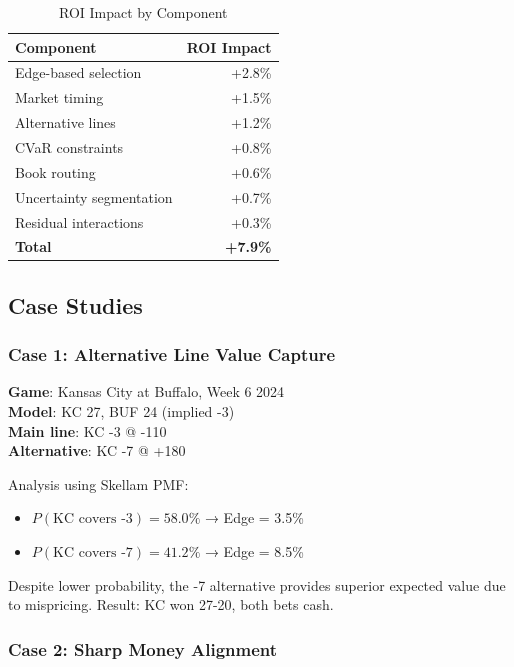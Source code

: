 

\begin{table}[!ht]
\centering
\caption{ROI Impact by Component}
\label{tab:profit-optimization-ablation}
\begin{tabular}{lr}
\toprule
 \textbf{Component} & \textbf{ROI Impact} \\
\midrule
Edge-based selection & +2.8\% \\
Market timing & +1.5\% \\
Alternative lines & +1.2\% \\
CVaR constraints & +0.8\% \\
Book routing & +0.6\% \\
Uncertainty segmentation & +0.7\% \\
Residual interactions & +0.3\% \\
\midrule
\textbf{Total} & \textbf{+7.9\%} \\
\bottomrule
\end{tabular}
\end{table}

\subsection{Case Studies}

\subsubsection{Case 1: Alternative Line Value Capture}

\textbf{Game}: Kansas City at Buffalo, Week 6 2024\\
\textbf{Model}: KC 27, BUF 24 (implied -3)\\
\textbf{Main line}: KC -3 @ -110\\
\textbf{Alternative}: KC -7 @ +180

Analysis using Skellam PMF:
\begin{itemize}
  \item $P(\text{KC covers -3}) = 58.0\%$ → Edge = 3.5\%
  \item $P(\text{KC covers -7}) = 41.2\%$ → Edge = 8.5\%
\end{itemize}

Despite lower probability, the -7 alternative provides superior expected value due to mispricing. Result: KC won 27-20, both bets cash.

\subsubsection{Case 2: Sharp Money Alignment}

